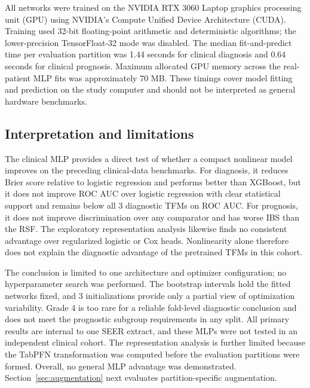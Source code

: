 \FloatBarrier
All networks were trained on the NVIDIA RTX 3060 Laptop graphics processing
unit (GPU) using NVIDIA's Compute Unified Device Architecture (CUDA).  Training
used 32-bit floating-point arithmetic and deterministic algorithms; the
lower-precision TensorFloat-32 mode was disabled.  The median fit-and-predict
time per evaluation partition was 1.44 seconds for clinical diagnosis and 0.64
seconds for clinical prognosis.  Maximum allocated GPU memory across the
real-patient MLP fits was approximately 70 MB.  These timings cover model
fitting and prediction on the study computer and should not be interpreted as
general hardware benchmarks.

\subsection{Interpretation and limitations}
\label{sec:mlp:limits}

The clinical MLP provides a direct test of whether a compact nonlinear model
improves on the preceding clinical-data benchmarks.  For diagnosis, it reduces
Brier score relative to logistic regression and performs better than XGBoost,
but it does not improve ROC AUC over logistic regression with clear statistical
support and remains below all 3 diagnostic TFMs on ROC AUC.  For prognosis, it
does not improve discrimination over any comparator and has worse IBS than the
RSF.  The exploratory representation analysis likewise finds no consistent
advantage over regularized logistic or Cox heads.  Nonlinearity alone therefore
does not explain the diagnostic advantage of the pretrained TFMs in this
cohort.

The conclusion is limited to one architecture and optimizer configuration; no
hyperparameter search was performed.  The bootstrap intervals hold the fitted
networks fixed, and 3 initializations provide only a partial view of optimization
variability.  Grade 4 is too rare for a reliable fold-level diagnostic conclusion
and does not meet the prognostic subgroup requirements in any split.  All
primary results are internal to one SEER extract, and these MLPs were not tested
in an independent clinical cohort.  The representation analysis is further
limited because the TabPFN transformation was computed before the evaluation
partitions were formed.  Overall, no general MLP advantage was demonstrated.
Section~\ref{sec:augmentation} next evaluates partition-specific augmentation.
